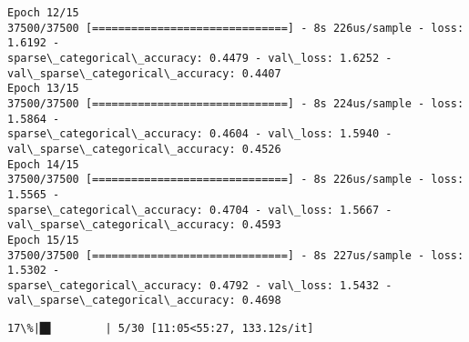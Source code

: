 \documentclass[11pt]{article}
\begin{document}
\begin{Verbatim}[commandchars=\\\{\}]
Epoch 12/15
37500/37500 [==============================] - 8s 226us/sample - loss: 1.6192 -
sparse\_categorical\_accuracy: 0.4479 - val\_loss: 1.6252 -
val\_sparse\_categorical\_accuracy: 0.4407
Epoch 13/15
37500/37500 [==============================] - 8s 224us/sample - loss: 1.5864 -
sparse\_categorical\_accuracy: 0.4604 - val\_loss: 1.5940 -
val\_sparse\_categorical\_accuracy: 0.4526
Epoch 14/15
37500/37500 [==============================] - 8s 226us/sample - loss: 1.5565 -
sparse\_categorical\_accuracy: 0.4704 - val\_loss: 1.5667 -
val\_sparse\_categorical\_accuracy: 0.4593
Epoch 15/15
37500/37500 [==============================] - 8s 227us/sample - loss: 1.5302 -
sparse\_categorical\_accuracy: 0.4792 - val\_loss: 1.5432 -
val\_sparse\_categorical\_accuracy: 0.4698
    \end{Verbatim}

    \begin{Verbatim}[commandchars=\\\{\}]
 17\%|█▋        | 5/30 [11:05<55:27, 133.12s/it]
    \end{Verbatim}
\end{document}
